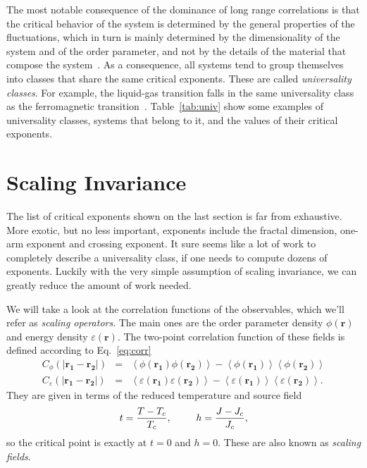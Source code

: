 The most notable consequence of the dominance of long range correlations is
that the critical behavior of the system is determined by the general
properties of the fluctuations, which in turn is mainly determined by the
dimensionality of the system and of the order parameter, and not by the details
of the material that compose the system~\cite{Stanley1999}. As a consequence,
all systems tend to group themselves into classes that share the same critical
exponents. These are called \textit{universality classes}. For example, the
liquid-gas transition falls in the same universality class as the ferromagnetic
transition~\cite{Kim1984}. Table~\ref{tab:univ} show some examples of
universality classes, systems that belong to it, and the values of their
critical exponents.




\section{Scaling Invariance}
\label{sec:scaling}
\renewcommand{\op}{\phi}

The list of critical exponents shown on the last section is far from
exhaustive. More exotic, but no less important, exponents include the fractal
dimension, one-arm exponent and crossing exponent. It sure seems like a lot of
work to completely describe a universality class, if one needs to compute
dozens of exponents. Luckily with the very simple assumption of scaling
invariance, we can greatly reduce the amount of work needed.

We will take a look at the correlation functions of the observables, which
we'll refer as \textit{scaling operators}. The main ones are the order
parameter density $\op(\mathbf{r})$ and energy density
$\varepsilon(\mathbf{r})$. The two-point correlation function of these fields is
defined according to Eq.~\ref{eq:corr}
\begin{eqnarray}
    \label{eq:corr10}
    C_{\op}\left(\left|\mathbf{r_1}-\mathbf{r_2}\right|\right) & = &
    \left\langle
        \op\left(\mathbf{r_{1}}\right)
        \op\left(\mathbf{r_{2}}\right)
    \right\rangle -
    \left\langle
        \op\left(\mathbf{r_{1}}\right)
    \right\rangle
    \left\langle
        \op\left(\mathbf{r_{2}}\right)
    \right\rangle
    \\
    \label{eq:corr11}
    C_{\varepsilon}\left(\left|\mathbf{r_1}-\mathbf{r_2}\right|\right) & = &
    \left\langle
        \varepsilon\left(\mathbf{r_{1}}\right)
        \varepsilon\left(\mathbf{r_{2}}\right)
    \right\rangle-
    \left\langle
        \varepsilon\left(\mathbf{r_{1}}\right)
    \right\rangle
    \left\langle
        \varepsilon\left(\mathbf{r_{2}}\right)
    \right\rangle.
\end{eqnarray}
They are given in terms of the reduced temperature and source field
\begin{equation}
    t=\frac{T-T_c}{T_c},\;\;\;\;\;\;\;\;\;h=\frac{J-J_c}{J_c},
\end{equation}
so the critical point is exactly at $t=0$ and $h=0$. These are also known
as \textit{scaling fields}.

